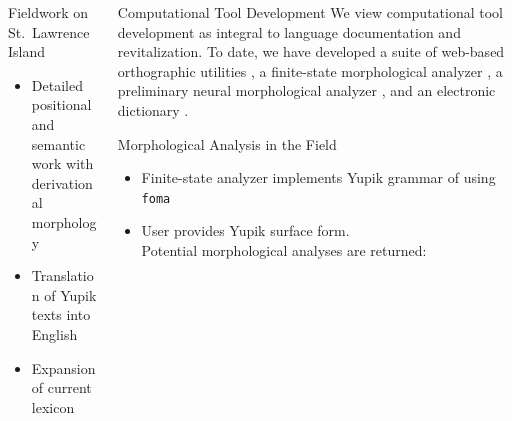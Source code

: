 \documentclass[usenames,dvipsnames]{beamer}
\begin{document}
\begin{frame}[fragile]
\begin{columns}[T]
\begin{column}{0.3\textwidth}
\begin{block}{Fieldwork on St.~Lawrence Island}
\begin{itemize}
        \item Detailed positional and semantic work with derivational morphology
        
        \item Translation of Yupik texts into English
        
        \item Expansion of current lexicon

    \end{itemize}
    \vspace*{3mm}
\end{block}

\end{column}

\begin{column}{0.29\textwidth}
\begin{block}{Computational Tool Development}
%
We view computational tool development as integral to language documentation and revitalization.
%
%
To date, we have developed a suite of web-based orthographic utilities \citep{SchwartzChen:2017}, a finite-state morphological analyzer \citep{ChenSchwartz:LREC:2018}, a preliminary neural morphological analyzer \citep{Schwartz:etal:ComputEL:2019}, and an electronic  dictionary \citep{Hunt:etal:ICLDC:2019}.
%
\end{block}

\begin{block}{Morphological Analysis in the Field}

\begin{itemize}
    \item Finite-state analyzer implements Yupik grammar of \citet{Jacobson:2001} using \texttt{foma} \citep{Hulden:2009} 

\vspace{18pt}

\item User provides Yupik surface form. \\ Potential morphological analyses are returned:

\vspace{9pt}



\end{itemize}
\end{block}
\end{column}
\end{columns}
\end{frame}
\end{document}
